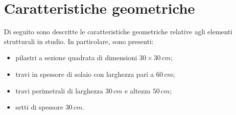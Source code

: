 \section{Caratteristiche geometriche}\label{sec:geomCar}
Di seguito sono descritte le caratteristiche geometriche relative agli elementi strutturali in studio. In particolare, sono presenti:
\begin{itemize}
 \item pilastri a sezione quadrata di dimensioni $30 \times 30\,\si{cm}$;
 \item travi in spessore di solaio con larghezza pari a $60\,\si{cm}$;
 \item travi perimetrali di larghezza $30\,\si{cm}$ e altezza $50\,\si{cm}$;
 \item setti di spessore $30\,\si{cm}$.
\end{itemize}

